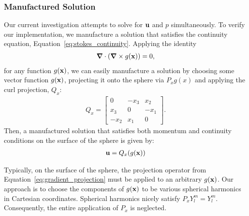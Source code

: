 
\subsubsection{Manufactured Solution}
Our current investigation attempts to solve for $\mathbf{u}$ and $p$ simultaneously. 
To verify our implementation, we manufacture a solution that satisfies the continuity equation, Equation~\ref{eq:stokes_continuity}. Applying the identity
\begin{align*} 
\mbox{\boldmath$ \nabla $} \cdot (\mbox{\boldmath$ \nabla $} \times g(\mathbf{x})) = 0,
\end{align*} 
for any function $g(\mathbf{x})$, we can easily manufacture a solution by choosing some vector function $g(\mathbf{x})$, projecting it onto the sphere via $P_x g(x)$ and applying the curl projection, $Q_x$: 
\begin{align*} 
Q_x = \begin{bmatrix} 0 & -x_3 & x_2 \\ x_3 & 0 & -x_1 \\ -x_2 & x_1 & 0 \end{bmatrix}.
\end{align*} 
Then, a manufactured solution that satisfies both momentum and continuity conditions on the surface of the sphere is given by: 
\begin{align*} 
\mathbf{u} = Q_x (g(\mathbf{x}))
\end{align*} 

Typically, on the surface of the sphere, the projection operator from Equation~\ref{eq:gradient_projection} must be applied to an arbitrary $g(\mathbf{x})$. 
Our approach is to choose the components of $g(\mathbf{x})$ to be various spherical harmonics in Cartesian coordinates. Spherical harmonics nicely satisfy $P_x Y_l^m = Y_l^m$. Consequently, the entire application of $P_x$ is neglected. 


